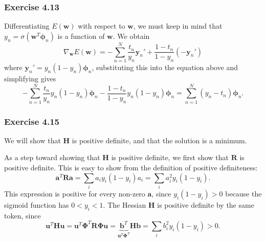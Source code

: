 \documentclass[12pt, a4paper]{article}
\newcommand{\vect}[1]{\bm{#1}}
\begin{document}
\subsubsection*{Exercise 4.13}
Differentiating $E(\vect{w})$ with respect to $\vect{w}$, we must keep in mind that $y_n = \sigma(\vect{w}^T \vect{\phi}_n)$ is a function of $\vect{w}$.
We obtain
\begin{equation*}
	\nabla_{\vect{w}} E (\vect{w})
	=
	- \sum_{n=1}^{N} \frac{t_n}{y_n} \vect{y}_n' + \frac{1 - t_n}{1 - y_n} (-\vect{y}_n')
\end{equation*}
where $\vect{y}_n' = y_n (1 - y_n) \vect{\phi}_n$, substituting this into the equation above and simplifying gives
\begin{equation*}
	- \sum_{n=1}^{N} \frac{t_n}{y_n} y_n (1 - y_n) \vect{\phi}_n - \frac{1 - t_n}{1 - y_n} y_n (1 - y_n) \vect{\phi}_n
	=
	\sum_{n=1}^{N} (y_n - t_n)  \vect{\phi}_n .
\end{equation*}



\subsubsection*{Exercise 4.15}
We will show that $\vect{H}$ is positive definite, and that the solution is a minimum.

As a step toward showing that $\vect{H}$ is positive definite, we first show that $\vect{R}$ is positive definite.
This is easy to show from the definition of positive definiteness:
\begin{equation*}
	\vect{a}^T \vect{R} \vect{a} = 
	\sum_i a_i y_i (1 - y_i) a_i = \sum_i a_i^2 y_i (1 - y_i).
\end{equation*}
This expression is positive for every non-zero $\vect{a}$, since $y_i (1 - y_i) > 0$ because the sigmoid function has $0 < y_i  <1$.
The Hessian $\vect{H}$ is positive definite by the same token, since
\begin{equation*}
\vect{u}^T \vect{H} \vect{u} = 
\vect{u}^T \vect{\Phi}^T \vect{R} \vect{\Phi} \vect{u} 
=
\underbrace{\vect{b}^T}_{ \vect{u}^T \vect{\Phi}^T } \vect{H} \vect{b}
=
\sum_i b_i^2 y_i (1 - y_i) > 0.
\end{equation*}
\end{document}
